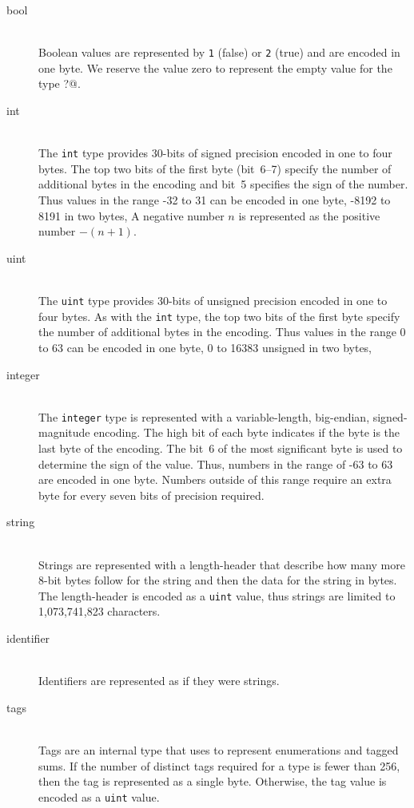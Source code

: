 \begin{description}
  \item[bool] \mbox{}\\
    Boolean values are represented by \lstinline!1! (false) or \lstinline!2! (true)
    and are encoded in one byte.  We reserve the value zero to represent the
    empty value for the type \lstinline@bool?@.

  \item[int] \mbox{}\\
    The \lstinline!int! type provides 30-bits of signed precision encoded in one to
    four bytes.
    The top two bits of the first byte (bit~6--7) specify the number of additional
    bytes in the encoding and bit~5 specifies the sign of the number.
    Thus values in the range -32 to 31 can be encoded in one byte,
    -8192 to 8191 in two bytes, \etc{}
    A negative number $n$ is represented as the positive number $-(n+1)$.

  \item[uint] \mbox{}\\
    The \lstinline!uint! type provides 30-bits of unsigned precision encoded in one
    to four bytes.
    As with the \lstinline!int! type, the top two bits of the first byte specify the
    number of additional bytes in the encoding.
    Thus values in the range 0 to 63 can be encoded in one byte,
    0 to 16383 unsigned in two bytes, \etc{}

  \item[integer] \mbox{}\\
    The \asdl{} \lstinline!integer! type is represented with a variable-length,
    big-endian, signed-magnitude encoding.
    The high bit of each byte indicates if the byte is the last byte of
    the encoding.
    The bit~6 of the most significant byte is used to determine the
    sign of the value.
    Thus, numbers in the range of -63 to 63 are encoded in one byte.
    Numbers outside of this range require an extra byte for every seven bits
    of precision required.

  \item[string] \mbox{}\\
    Strings are represented with a length-header that describe how many more
    8-bit bytes follow for the string and then the data for the string in bytes.
    The length-header is encoded as a \lstinline!uint! value, thus strings are limited
    to 1,073,741,823 characters.

  \item[identifier] \mbox{}\\
    Identifiers are represented as if they were strings.

  \item[tags] \mbox{}\\
    Tags are an internal type that \asdl{} uses to represent enumerations and
    tagged sums.
    If the number of distinct tags required for a type is fewer than 256, then
    the tag is represented as a single byte.
    Otherwise, the tag value is encoded as a \lstinline!uint! value.
\end{description}%

